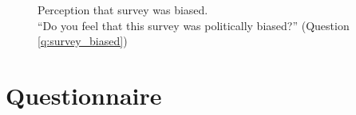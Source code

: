 \documentclass[12pt,english]{article}
\begin{document}

\begin{figure}[h!] 
    \caption[Perception that survey was biased]{Perception that survey was biased. \\ ``Do you feel that this survey was politically biased?'' (Question \ref{q:survey_biased})}\label{fig:survey_biased}
\end{figure}




\clearpage
\section{Questionnaire}
\end{document}
